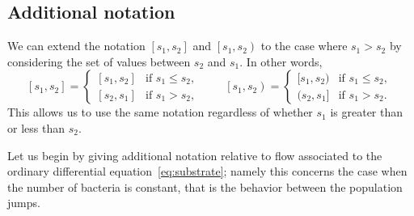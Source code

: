 \documentclass[AHL,Unicode,longabstracts,published]{cedram}
\newcommand{\ens}[2]{\left[#1,#2\right]}
\newcommand{\ensco}[2]{\left[#1,#2\right)}
\newcommand{\1}{\mathbf{1}}
\begin{document}
\subsection{Additional notation}\label{sec.add.notations}


We can extend the notation $\ens{s_1}{s_2}$ and $\ensco{s_1}{s_2}$ to the case where $s_1 > s_2$ by considering the set of values between $s_2$ and $s_1$. In other words,
\[
\ens{s_1}{s_2}=
\begin{cases}
[s_1,s_2] & \text{if }s_1\leq s_2,\\
[s_2,s_1] & \text{if }s_1>s_2,
\end{cases}\,
\qquad
\ensco{s_1}{s_2}=
\begin{cases}
[s_1,s_2) & \text{if }s_1\leq s_2,\\
(s_2,s_1] & \text{if }s_1>s_2.
\end{cases}\,
\]
This allows us to use the same notation regardless of whether $s_1$ is greater than or less than $s_2$.



Let us begin by giving additional notation relative to flow associated to the ordinary differential equation~\eqref{eq:substrate}; namely this concerns the case when the number of bacteria is constant, that is the behavior between the population jumps.
\end{document}
